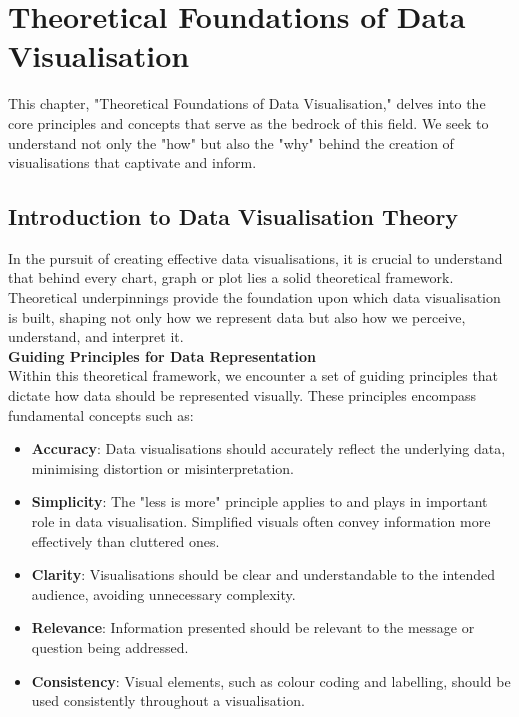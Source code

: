 \documentclass{article}\usepackage[]{graphicx}\usepackage[]{xcolor}
\begin{document}
\newpage 


\section{Theoretical Foundations of Data Visualisation}
This chapter, "Theoretical Foundations of Data Visualisation," delves into the core principles and concepts that serve as the bedrock of this field. We seek to understand not only the "how" but also the "why" behind the creation of visualisations that captivate and inform.

\subsection{Introduction to Data Visualisation Theory}
In the pursuit of creating effective data visualisations, it is crucial to understand that behind every chart, graph or plot lies a solid theoretical framework. Theoretical underpinnings provide the foundation upon which data visualisation is built, shaping not only how we represent data but also how we perceive, understand, and interpret it.\\ 

\textbf{Guiding Principles for Data Representation}\\
Within this theoretical framework, we encounter a set of guiding principles that dictate how data should be represented visually. These principles encompass fundamental concepts such as:
\begin{itemize}
    \item \textbf{Accuracy}: Data visualisations should accurately reflect the underlying data, minimising distortion or misinterpretation.
    \item \textbf{Simplicity}: The "less is more" principle applies to and plays in important role in data visualisation. Simplified visuals often convey information more effectively than cluttered ones.
    \item \textbf{Clarity}: Visualisations should be clear and understandable to the intended audience, avoiding unnecessary complexity.
    \item \textbf{Relevance}: Information presented should be relevant to the message or question being addressed.
    \item \textbf{Consistency}: Visual elements, such as colour coding and labelling, should be used consistently throughout a visualisation.
\end{itemize}
\end{document}
